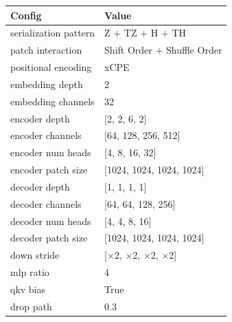 \begin{tabular}{lx{40mm}}\toprule
Config &Value \\\midrule
serialization pattern &Z + TZ + H + TH \\
patch interaction &Shift Order + Shuffle Order \\
positional encoding &xCPE \\
embedding depth &2 \\
embedding channels &32 \\
encoder depth &[2, 2, 6, 2] \\
encoder channels &[64, 128, 256, 512] \\
encoder num heads &[4, 8, 16, 32] \\
encoder patch size &[1024, 1024, 1024, 1024] \\
decoder depth &[1, 1, 1, 1] \\
decoder channels &[64, 64, 128, 256] \\
decoder num heads &[4, 4, 8, 16] \\
decoder patch size &[1024, 1024, 1024, 1024] \\
down stride &[$\times$2, $\times$2, $\times$2, $\times$2] \\
mlp ratio &4 \\
qkv bias &True \\
drop path &0.3 \\
\bottomrule
\end{tabular}